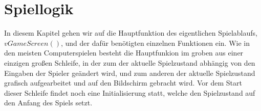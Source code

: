 
\chapter{Spiellogik}
\label{Spiel_Logik}
%
In diesem Kapitel gehen wir auf die Hauptfunktion des eigentlichen Spielablaufs, $vGameScreen()$, und der daf{\"u}r ben{\"o}tigten einzelnen Funktionen ein. Wie in den meisten Computerspielen besteht die Hauptfunkion im groben aus einer einzigen gro{\ss}en Schleife, in der zum der aktuelle Spielzustand abh{\"a}ngig von den Eingaben der Spieler ge{\"a}ndert wird, und zum anderen der aktuelle Spielzustand grafisch aufgearbeitet und auf den Bildschirm gebracht wird. Vor dem Start dieser Schleife findet noch eine Initialisierung statt, welche den Spielzustand auf den Anfang des Spiels setzt.
%

